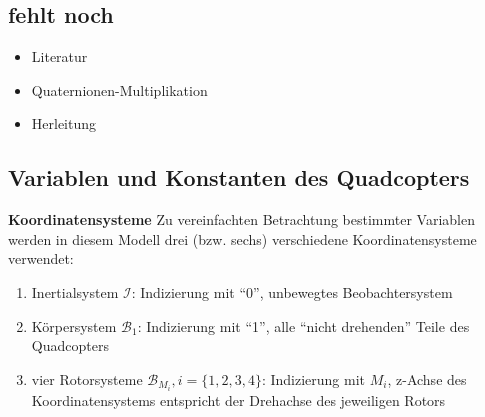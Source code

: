 \documentclass[12pt, a4paper]{scrartcl}
\begin{document}
\subsection{fehlt noch}

\begin{itemize}
	\item Literatur
	\item Quaternionen-Multiplikation
	\item Herleitung
\end{itemize}

\subsection{Variablen und Konstanten des Quadcopters}

\textbf{Koordinatensysteme}
Zu vereinfachten Betrachtung bestimmter Variablen werden in diesem Modell drei (bzw. sechs) verschiedene Koordinatensysteme verwendet:

\begin{enumerate}
	\item Inertialsystem $ \mathcal{I} $: Indizierung mit "`0"', unbewegtes Beobachtersystem
	\item Körpersystem $ \mathcal{B}_1 $: Indizierung mit "`1"', alle "`nicht drehenden"' Teile des Quadcopters
	\item vier Rotorsysteme $ \mathcal{B}_{M_i}, i=\{1,2,3,4\} $: Indizierung mit $ M_i $, z-Achse des Koordinatensystems entspricht der Drehachse des jeweiligen Rotors
\end{enumerate}
\end{document}
